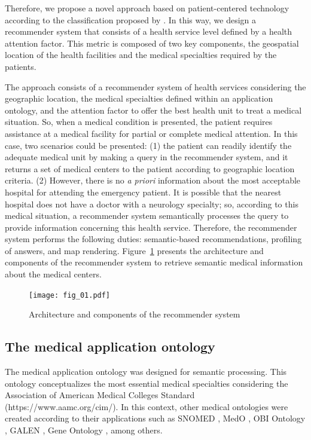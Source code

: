 \documentclass[sustainability,article,submit,pdftex,moreauthors]{Definitions/mdpi}
\begin{document}
Therefore, we propose a novel approach based on patient-centered technology according to the classification proposed by \citet{kraus2021digital}. In this way, we design a recommender system that consists of a health service level defined by a health attention factor. This metric is composed of two key components, the geospatial location of the health facilities and the medical specialties required by the patients. 

The approach consists of a recommender system of health services considering the geographic location, the medical specialties defined within an application ontology, and the attention factor to offer the best health unit to treat a medical situation. So, when a medical condition is presented, the patient requires assistance at a medical facility for partial or complete medical attention. In this case, two scenarios could be presented: (1) the patient can readily identify the adequate medical unit by making a query in the recommender system, and it returns a set of medical centers to the patient according to geographic location criteria. (2) However, there is no \textit{a priori} information about the most acceptable hospital for attending the emergency patient. It is possible that the nearest hospital does not have a doctor with a neurology specialty; so, according to this medical situation, a recommender system semantically processes the query to provide information concerning this health service. Therefore, the recommender system performs the following duties: semantic-based recommendations, profiling of answers, and map rendering. Figure~\ref{fig:arquitectura} presents the architecture and components of the recommender system to retrieve semantic medical information about the medical centers.

\begin{figure}
	\begin{center}
		\texttt{[image: fig\_01.pdf]}
	\end{center}
	\caption{Architecture and components of the recommender system\label{fig:arquitectura}}
\end{figure}

\subsection{The medical application ontology}

The medical application ontology was designed for semantic processing. This ontology conceptualizes the most essential medical specialties considering the Association of American Medical Colleges Standard (https://www.aamc.org/cim/). In this context, other medical ontologies were created according to their applications such as SNOMED \citep{cornet2008forty}, MedO \citep{fujita2010multiviews}, OBI Ontology \citep{bandrowski2016ontology}, GALEN \citep{rector2006ontological}, Gene Ontology \citep{gene2019gene}, among others.
\end{document}
